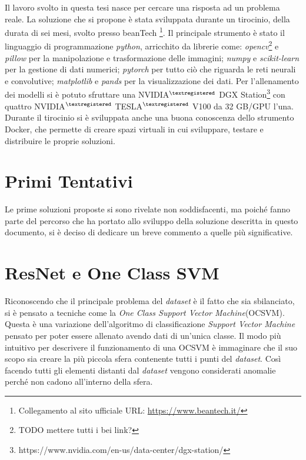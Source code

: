 Il lavoro svolto in questa tesi nasce per cercare una risposta ad un problema reale.
La soluzione che si propone è stata sviluppata durante un tirocinio, della durata di sei mesi, svolto presso beanTech \footnote{Collegamento al sito ufficiale URL: \url{https://www.beantech.it/}}.
Il principale strumento è stato il linguaggio di programmazione \textit{python}, arricchito da librerie come:
\textit{opencv}\footnote{TODO mettere tutti i bei link?} e \textit{pillow} per la manipolazione e trasformazione delle immagini; 
\textit{numpy} e \textit{scikit-learn} per la gestione di dati numerici;
\textit{pytorch} per tutto ciò che riguarda le reti neurali e convolutive;
\textit{matplotlib} e \textit{pands} per la visualizzazione dei dati.
Per l'allenamento dei modelli si è potuto sfruttare una NVIDIA$^{\tiny{\textregistered}}$ DGX Station\footnote{https://www.nvidia.com/en-us/data-center/dgx-station/} con quattro NVIDIA$^{\tiny{\textregistered}}$ TESLA$^{\tiny{\textregistered}}$ V100 da 32 GB/GPU l'una.
Durante il tirocinio si è sviluppata anche una buona conoscenza dello strumento Docker, che permette di creare spazi virtuali in cui sviluppare, testare e distribuire le proprie soluzioni.


\clearpage

\section{Primi Tentativi}
Le prime soluzioni proposte si sono rivelate non soddisfacenti, ma poiché fanno parte del percorso che ha portato allo sviluppo della soluzione descritta in questo documento, si è deciso di dedicare un breve commento a quelle più significative.

\section{ResNet e One Class SVM}
Riconoscendo che il principale problema del \textit{dataset} è il fatto che sia sbilanciato, si è pensato a tecniche come la \textit{One Class Support Vector Machine}(OCSVM).
Questa è una variazione dell'algoritmo di classificazione \textit{Support Vector Machine} pensato per poter essere allenato avendo dati di un'unica classe.
Il modo più intuitivo per descrivere il funzionamento di una OCSVM è immaginare che il suo scopo sia creare la più piccola sfera contenente tutti i punti del \textit{dataset}.
Così facendo tutti gli elementi distanti dal \textit{dataset} vengono considerati anomalie perché non cadono all'interno della sfera.

